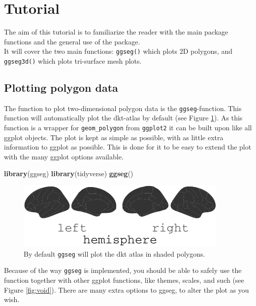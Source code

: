 \documentclass[fleqn,10pt]{wlpeerj} %
\newenvironment{Shaded}{\begin{snugshade}}{\end{snugshade}}
\newcommand{\KeywordTok}[1]{\textcolor[rgb]{0.13,0.29,0.53}{\textbf{#1}}}
\newcommand{\NormalTok}[1]{#1}
\begin{document}
\hypertarget{tutorial}{%
\section{Tutorial}\label{tutorial}}

The aim of this tutorial is to familiarize the reader with the main package functions and the general use of the package.\\
It will cover the two main functions: \texttt{ggseg()} which plots 2D polygons, and \texttt{ggseg3d()} which plots tri-surface mesh plots.

\hypertarget{plotting-polygon-data}{%
\subsection{Plotting polygon data}\label{plotting-polygon-data}}

The function to plot two-dimensional polygon data is the \texttt{ggseg}-function.
This function will automatically plot the dkt-atlas by default (see Figure \ref{fig:init}).
As this function is a wrapper for \texttt{geom\_polygon} from \texttt{ggplot2} it can be built upon like all ggplot objects.
The plot is kept as simple as possible, with as little extra information to ggplot as possible.
This is done for it to be easy to extend the plot with the many ggplot options available.

\begin{Shaded}
\begin{Highlighting}[]
\KeywordTok{library}\NormalTok{(ggseg)}
\KeywordTok{library}\NormalTok{(tidyverse)}
\KeywordTok{ggseg}\NormalTok{()}
\end{Highlighting}
\end{Shaded}

\begin{figure}
\centering
\includegraphics{draft_1_files/figure-latex/init-1.pdf}
\caption{\label{fig:init}By default \texttt{ggseg} will plot the dkt atlas in shaded polygons.}
\end{figure}

Because of the way \texttt{ggseg} is implemented, you should be able to safely use the function together with other ggplot functions, like themes, scales, and such (see Figure \ref{fig:void}).
There are many extra options to ggseg, to alter the plot as you wish.
\end{document}
